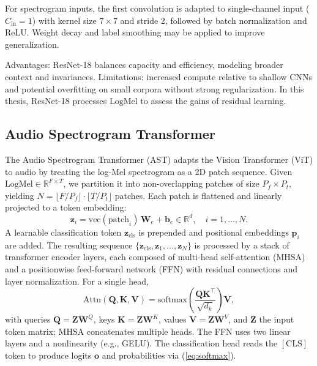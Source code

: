 For spectrogram inputs, the first convolution is adapted to single-channel input (\(C_{\text{in}}=1\)) with kernel size \(7\!\times\!7\) and stride 2, followed by batch normalization and ReLU. Weight decay and label smoothing may be applied to improve generalization.

Advantages: ResNet-18 balances capacity and efficiency, modeling broader context and invariances. Limitations: increased compute relative to shallow CNNs and potential overfitting on small corpora without strong regularization. In this thesis, ResNet-18 processes \(\mathrm{LogMel}\) to assess the gains of residual learning.

\subsection{Audio Spectrogram Transformer}

The Audio Spectrogram Transformer (AST) adapts the Vision Transformer (ViT) to audio by treating the log-Mel spectrogram as a 2D patch sequence. Given \(\mathrm{LogMel} \in \mathbb{R}^{F\times T}\), we partition it into non-overlapping patches of size \(P_f\!\times\!P_t\), yielding \(N = \lfloor F/P_f \rfloor \cdot \lfloor T/P_t \rfloor\) patches. Each patch is flattened and linearly projected to a token embedding:
\begin{equation}\label{eq:patchify}
\mathbf{z}_i = \mathrm{vec}(\mathrm{patch}_i)\, \mathbf{W}_e + \mathbf{b}_e \in \mathbb{R}^{d}, \quad i=1,\dots,N.
\end{equation}
A learnable classification token \(\mathbf{z}_{\mathrm{cls}}\) is prepended and positional embeddings \(\mathbf{p}_i\) are added. The resulting sequence \(\{\mathbf{z}_{\mathrm{cls}}, \mathbf{z}_1,\dots,\mathbf{z}_N\}\) is processed by a stack of transformer encoder layers, each composed of multi-head self-attention (MHSA) and a positionwise feed-forward network (FFN) with residual connections and layer normalization. For a single head,
\begin{equation}\label{eq:attn}
\mathrm{Attn}(\mathbf{Q},\mathbf{K},\mathbf{V}) = \mathrm{softmax}\!\left( \frac{\mathbf{Q}\mathbf{K}^\top}{\sqrt{d_k}} \right) \mathbf{V},
\end{equation}
with queries \(\mathbf{Q}=\mathbf{Z}\mathbf{W}^Q\), keys \(\mathbf{K}=\mathbf{Z}\mathbf{W}^K\), values \(\mathbf{V}=\mathbf{Z}\mathbf{W}^V\), and \(\mathbf{Z}\) the input token matrix; MHSA concatenates multiple heads. The FFN uses two linear layers and a nonlinearity (e.g., GELU). The classification head reads the \([\mathrm{CLS}]\) token to produce logits \(\mathbf{o}\) and probabilities via (\ref{eq:softmax}).

